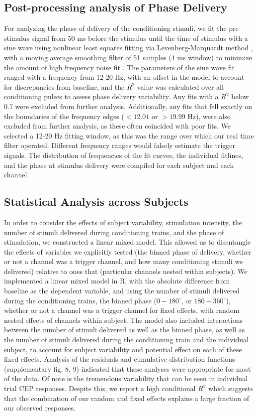 \subsection{Post-processing analysis of Phase Delivery}
For analyzing the phase of delivery of the conditioning stimuli, we fit the pre stimulus signal from 50 ms before the stimulus until the time of stimulus with a sine wave using nonlinear least squares fitting via Levenberg-Marquardt method \cite{Marquardt1963}, with a moving average smoothing filter of 51 samples (4 ms window) to minimize the amount of high frequency noise fit \cite{Zanos2018}. The parameters of the sine wave fit ranged with a frequency from 12-20 Hz, with an offset in the model to account for discrepancies from baseline, and the $R^2$ value was calculated over all conditioning pulses to assess  phase delivery variability. Any fits with a $R^2$  below 0.7 were excluded from further analysis. Additionally, any fits that fell exactly on the boundaries of the frequency edges ($<12.01$ or $>19.99$ Hz), were also excluded from further analysis, as these often coincided with poor fits. We selected a 12-20 Hz fitting window, as this was the range over which our real time filter operated. Different frequency ranges would falsely estimate the trigger signals. The distribution of frequencies of the fit curves, the individual fitlines, and the phase at stimulus delivery were compiled for each subject and each channel 

\subsection{Statistical Analysis across Subjects}
In order to consider the effects of subject variability, stimulation intensity, the number of stimuli delivered during conditioning trains, and the phase of stimulation, we constructed a linear mixed model. This allowed us to disentangle the effects of variables we explicitly tested (the binned phase of delivery, whether or not a channel was a trigger channel, and how many conditioning stimuli we delivered) relative to ones that (particular channels nested within subjects). We implemented a linear mixed model in R, with the absolute difference from baseline as the dependent variable, and using the number of stimuli delivered during the conditioning trains, the binned phase ($0-180^\circ$, or $180-360^\circ$), whether or not a channel was a trigger channel for fixed effects, with random nested effects of channels within subject. The model also included interactions between the number of stimuli delivered as well as the binned phase, as well as the number of stimuli delivered during the conditioning train and the individual subject, to account for subject variability and potential effect on each of these fixed effects. Analysis of the residuals and cumulative distribution functions (supplementary fig. 8, 9) indicated that these analyses were appropriate for most of the data. Of note is the tremendous variability that can be seen in individual trial CEP responses. Despite this, we report a high conditional $R^2$ which suggests that the combination of our random and fixed effects explains a large fraction of our observed responses. 

